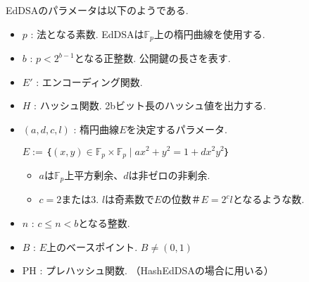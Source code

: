 EdDSAのパラメータは以下のようである.
\begin{itemize}
  \item $p$ : 法となる素数. EdDSAは$\mathbb{F}_p$上の楕円曲線を使用する.
  \item $b$ : $p<2^{b-1}$となる正整数. 公開鍵の長さを表す. 
  \item $E'$ : エンコーディング関数.
  \item $H$ : ハッシュ関数. 2bビット長のハッシュ値を出力する.
  \item $(a,d,c,l)$ : 楕円曲線$E$を決定するパラメータ. \\
        \begin{center}
          $E := ｛(x,y) \in \mathbb{F}_p \times \mathbb{F}_p \mid ax^2 + y^2 = 1 + dx^2y^2｝$
        \end{center}
        \begin{itemize}
          \item $a$は$\mathbb{F}_p$上平方剰余、$d$は非ゼロの非剰余.
          \item $c=2$または$3$. $l$は奇素数で$E$の位数$＃E=2^{c}l$となるような数.
        \end{itemize}
  \item $n$ : $c\leq n < b$となる整数.
  \item $B$ : $E$上のベースポイント. $B\neq (0,1)$
  \item PH : プレハッシュ関数. （HashEdDSAの場合に用いる）
\end{itemize}
